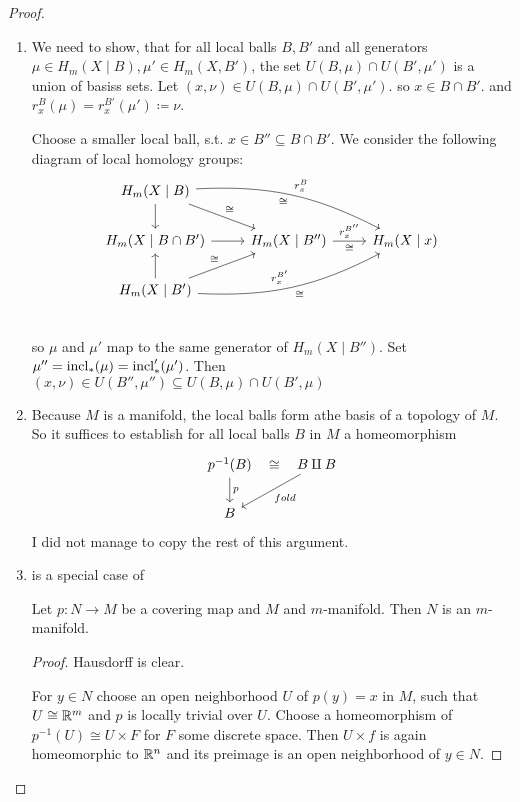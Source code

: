 \documentclass[language=english]{TemplateLecture}
\begin{document}
\begin{proof}
    \begin{enumerate}
        \item We need to show, that for all local balls \(B, B'\) and all generators \(\mu \in H_m(X \mid B), \mu' \in H_m(X,B')\), the set \(U(B, \mu) \cap U(B', \mu')\) is a union of basiss sets. Let \((x, \nu) \in U(B, \mu) \cap U(B', \mu')\). so \(x \in B \cap B'\). and \(r_x^B(\mu) = r_x^{B'}(\mu') \coloneq \nu\).

        Choose a smaller local ball, s.t. \(x \in B'' \subseteq B \cap B'\). We consider the following diagram of local homology groups:
        \[\begin{tikzcd}
            H_m(X \mid B) \ar[rrd, "r_x^B", "\cong"', bend left=15]\ar[d] \ar[dr, "\cong"] & & \\
            H_m(X\mid B \cap B') \ar[r] & H_m(X \mid B'') \ar[r, "r_x^{B''}", "\cong"'] & H_m(X \mid x) \\
            H_m(X \mid B') \ar[rru, "r_x^{B'}", "\cong"', bend right=15] \ar[u] \ar[ur, "\cong"]\\
        \end{tikzcd}\]
        so \(\mu\) and \(\mu'\) map to the same generator of \(H_m(X \mid B'')\). Set \(\mu'' = \operatorname{incl}_*(\mu) = \operatorname{incl}'_*(\mu')\). Then \((x, \nu) \in U(B'', \mu'') \subseteq U(B, \mu) \cap U(B', \mu)\)

        \item Because \(M\) is a manifold, the local balls form athe basis of a topology of \(M\). So it suffices to establish for all local balls \(B\) in \(M\) a homeomorphism
        \[\begin{tikzcd}
            p^{-1}(B)\ar[d, "p"] \ar[r, phantom, "\cong"] & B\amalg B  \ar[dl, "fold"]\\
            B
        \end{tikzcd}\]
        I did not manage to copy the rest of this argument.

        \item is a special case of 
        \begin{proposition}
            Let \(p \colon N \to M\) be a covering map and \(M\) and \(m\)-manifold. Then \(N\) is an \(m\)-manifold.
        \end{proposition}
        \begin{proof}
            Hausdorff is clear. 

            For \(y \in N\) choose an open neighborhood \(U\) of \(p(y) = x\) in \(M\), such that \(U \cong \mathbb{R}^m\) and \(p\) is locally trivial over \(U\). Choose a homeomorphism of \(p^{-1}(U) \cong U\times F\) for \(F\) some discrete space. Then \(U\times {f}\) is again homeomorphic to \(\mathbb{R}^n\) and its preimage is an open neighborhood of \(y \in N\).
        \end{proof}
\end{enumerate}
\end{proof}
\end{document}
